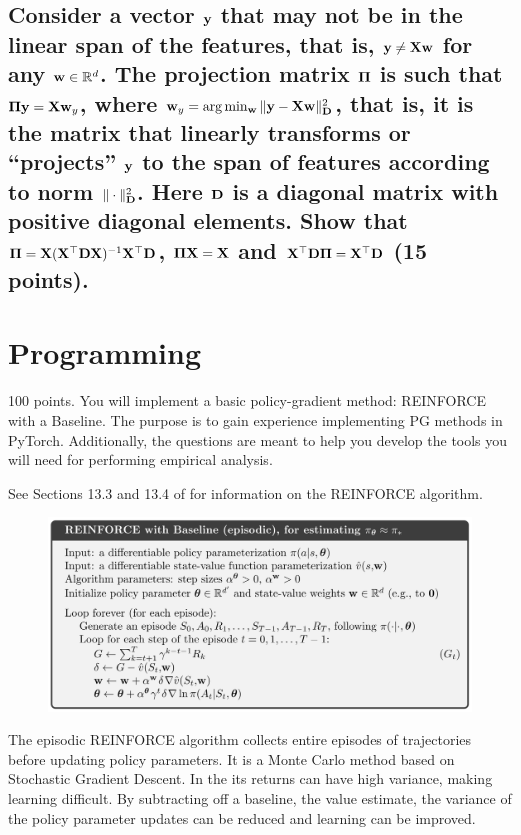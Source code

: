 \documentclass{article}
\newcommand{\X}{{\bf X}}
\newcommand{\y}{{\bf y}}
\newcommand{\w}{{\bf w}}
\newcommand{\PI}{{\bf \Pi}}
\newcommand{\Real}{{\mathbb{R}}}
\newcommand{\D}{{\bf D}}
\begin{document}
\newpage

\subsection{\normalsize 
Consider a vector $\y$ that may not be in the linear span of the features, that is, $\y\ne\X\w$ for any $\w\in\Real^d$. The projection matrix $\PI$ is such that $\PI \y = \X\w_y $, where $\w_y = \arg\min_{\w} \Vert \y - \X\w \Vert^2_\D$, that is, it is the matrix that linearly transforms or ``projects'' $\y$ to the span of features according to norm $\Vert \cdot \Vert^2_\D$. Here $\D$ is a diagonal matrix with positive diagonal elements. Show that $\PI = \X(\X^\top \D\X)^{-1}\X^\top\D$, $\PI\X=\X$ and $\X^\top\D\PI=\X^\top\D$
 (15 points).
}

\newpage

\section{Programming}
\label{sec:programming}

100 points. You will implement a basic policy-gradient method: REINFORCE with a Baseline. The purpose is to gain experience implementing PG methods in PyTorch. Additionally, the questions are meant to help you develop the tools you will need for performing empirical analysis.

See Sections 13.3 and 13.4 of  for information on the REINFORCE algorithm.

\begin{figure}[h]
\begin{center}
\centerline{\includegraphics[height=\imgheight]{img/REINFORCE.png}}
\caption{\citep{Sutton2018}}
\label{fig:reinforce}
\end{center}
\end{figure}

The episodic REINFORCE algorithm collects entire episodes of trajectories before updating policy parameters. It is a Monte Carlo method based on Stochastic Gradient Descent. In the  its returns can have high variance, making learning difficult. By subtracting off a baseline, the value estimate, the variance of the policy parameter updates can be reduced and learning can be improved.
\end{document}
